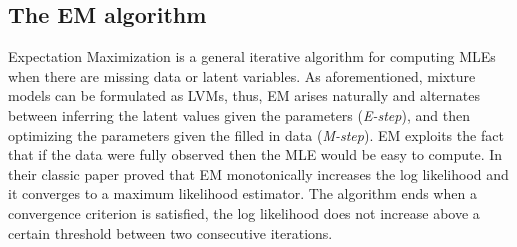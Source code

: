 \subsection{The EM algorithm} \label{em-algorithm-l-subsect}
Expectation Maximization is a general iterative algorithm for computing MLEs when there are missing data or latent variables. As aforementioned, mixture models can be formulated as LVMs, thus, EM arises naturally and alternates between inferring the latent values given the parameters (\emph{E-step}), and then optimizing the parameters given the filled in data (\emph{M-step}). EM exploits the fact that if the data were fully observed then the MLE would be easy to compute. In their classic paper \cite{Dempster1977} proved that EM monotonically increases the log likelihood and it converges to a maximum likelihood estimator. The algorithm ends when a convergence criterion is satisfied, \eg the log likelihood does not increase above a certain threshold between two consecutive iterations. 

